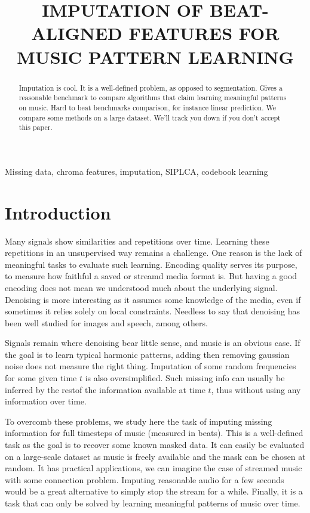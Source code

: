 \documentclass{article}
\title{IMPUTATION OF BEAT-ALIGNED FEATURES FOR MUSIC PATTERN LEARNING}
\begin{document}
%
\maketitle
%
\begin{abstract}
Imputation is cool. It is a well-defined problem, as opposed to segmentation.
Gives a reasonable benchmark to compare algorithms that claim learning meaningful
patterns on music. Hard to beat benchmarks comparison, for instance linear
prediction. We compare some methods on a large dataset. We'll track you down
if you don't accept this paper.
\end{abstract}
%
\begin{keywords}
Missing data, chroma features, imputation, SIPLCA, codebook learning
\end{keywords}
%
\section{Introduction}
\label{sec:intro}
Many signals show similarities and repetitions over time. Learning these repetitions
in an unsupervised way remains a challenge. One reason is the lack of meaningful
tasks to evaluate such learning. Encoding quality serves its purpose, to measure
how faithful a saved or streamd media format is. But having a good encoding
does not mean we understood much about the underlying signal. Denoising is more
interesting as it assumes some knowledge of the media, even if sometimes it relies
solely on local constraints. Needless to say that denoising has been well studied 
for images and speech, among others.

Signals remain where denoising bear little sense, and music is an obvious case.
If the goal is to learn typical harmonic patterns, adding then removing gaussian
noise does not measure the right thing. Imputation of some random frequencies
for some given time $t$ is also oversimplified. Such missing info can usually
be inferred by the restof the information available at time $t$, thus without
using any information over time.

To overcomb these problems, we study here the task of imputing missing information
for full timesteps of music (measured in beats). This is a well-defined task
as the goal is to recover some known masked data. It can easily be evaluated on a
large-scale dataset as music is freely available and the mask can be chosen
at random. It has practical applications, we can imagine the case of streamed music
with some connection problem. Imputing reasonable audio for a few seconds would
be a great alternative to simply stop the stream for a while. Finally, it is a
task that can only be solved by learning meaningful patterns of music over time.
\end{document}
